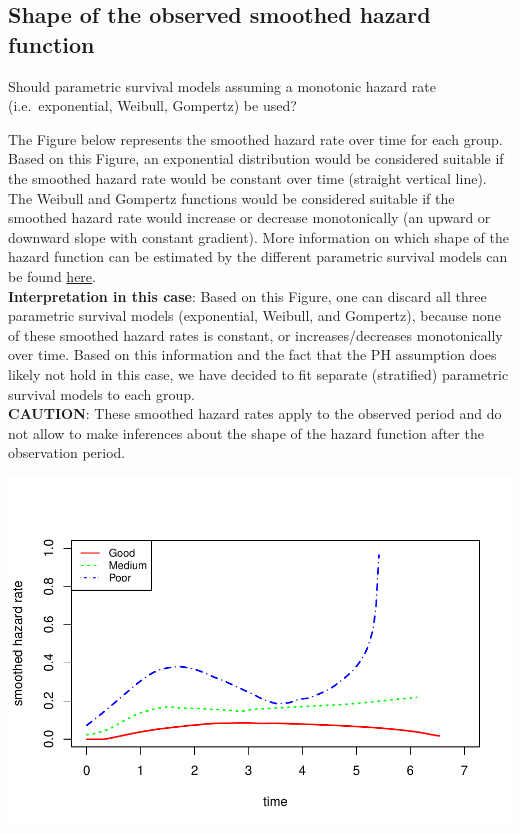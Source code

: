 \documentclass[]{article}
\begin{document}
\subsection{Shape of the observed smoothed hazard
function}\label{shape-of-the-observed-smoothed-hazard-function}

Should parametric survival models assuming a monotonic hazard rate
(i.e.~exponential, Weibull, Gompertz) be used?

The Figure below represents the smoothed hazard rate over time for each
group. Based on this Figure, an exponential distribution would be
considered suitable if the smoothed hazard rate would be constant over
time (straight vertical line). The Weibull and Gompertz functions would
be considered suitable if the smoothed hazard rate would increase or
decrease monotonically (an upward or downward slope with constant
gradient). More information on which shape of the hazard function can be
estimated by the different parametric survival models can be found
\href{https://devinincerti.com/2019/06/18/parametric_survival.html}{here}.\\
\textbf{Interpretation in this case}: Based on this Figure, one can
discard all three parametric survival models (exponential, Weibull, and
Gompertz), because none of these smoothed hazard rates is constant, or
increases/decreases monotonically over time. Based on this information
and the fact that the PH assumption does likely not hold in this case,
we have decided to fit separate (stratified) parametric survival models
to each group.\\
\textbf{CAUTION}: These smoothed hazard rates apply to the observed
period and do not allow to make inferences about the shape of the hazard
function after the observation period.

\begin{flushleft}\includegraphics{Images/plot_hr-1} \end{flushleft}
\end{document}
